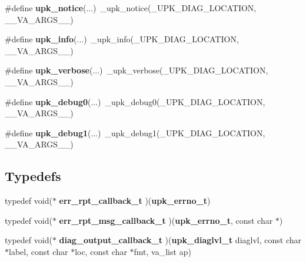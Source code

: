\begin{DoxyCompactItemize}
\item 
\#define {\bf upk\_\-notice}(...)~\_\-upk\_\-notice(\_\-UPK\_\-DIAG\_\-LOCATION, \_\-\_\-VA\_\-ARGS\_\-\_\-)
\item 
\#define {\bf upk\_\-info}(...)~\_\-upk\_\-info(\_\-UPK\_\-DIAG\_\-LOCATION, \_\-\_\-VA\_\-ARGS\_\-\_\-)
\item 
\#define {\bf upk\_\-verbose}(...)~\_\-upk\_\-verbose(\_\-UPK\_\-DIAG\_\-LOCATION, \_\-\_\-VA\_\-ARGS\_\-\_\-)
\item 
\#define {\bf upk\_\-debug0}(...)~\_\-upk\_\-debug0(\_\-UPK\_\-DIAG\_\-LOCATION, \_\-\_\-VA\_\-ARGS\_\-\_\-)
\item 
\#define {\bf upk\_\-debug1}(...)~\_\-upk\_\-debug1(\_\-UPK\_\-DIAG\_\-LOCATION, \_\-\_\-VA\_\-ARGS\_\-\_\-)
\end{DoxyCompactItemize}
\subsection*{Typedefs}
\begin{DoxyCompactItemize}
\item 
typedef void($\ast$ {\bf err\_\-rpt\_\-callback\_\-t} )({\bf upk\_\-errno\_\-t})
\item 
typedef void($\ast$ {\bf err\_\-rpt\_\-msg\_\-callback\_\-t} )({\bf upk\_\-errno\_\-t}, const char $\ast$)
\item 
typedef void($\ast$ {\bf diag\_\-output\_\-callback\_\-t} )({\bf upk\_\-diaglvl\_\-t} diaglvl, const char $\ast$label, const char $\ast$loc, const char $\ast$fmt, va\_\-list ap)
\end{DoxyCompactItemize}
